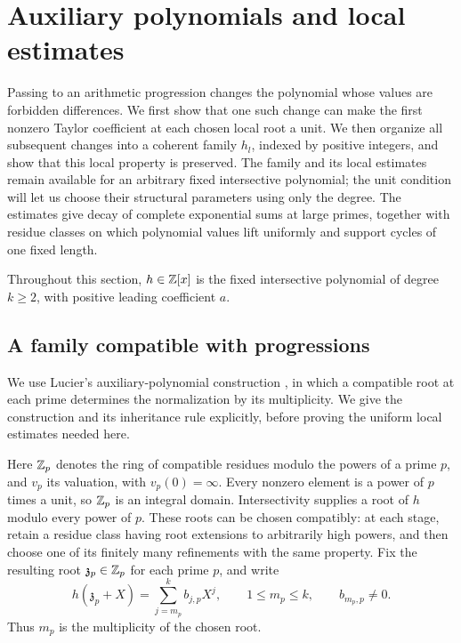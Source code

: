 \section{Auxiliary polynomials and local estimates}\label{sec:local}

Passing to an arithmetic progression changes the polynomial whose values are
forbidden differences. We first show that one such change can make the first
nonzero Taylor coefficient at each chosen local root a unit. We then organize
all subsequent changes into a coherent family \(h_l\), indexed by positive
integers, and show that this local property is preserved. The family and its
local estimates remain available for an arbitrary fixed intersective
polynomial; the unit condition will let us choose their structural parameters
using only the degree. The estimates give decay of complete exponential sums
at large primes, together with residue classes on which polynomial values
lift uniformly and support cycles of one fixed length.

Throughout this section, \(h\in\mathbb Z[x]\) is the fixed intersective polynomial of
degree \(k\ge2\), with positive leading coefficient \(a\).

\subsection{A family compatible with progressions}

We use Lucier's auxiliary-polynomial construction
\cite[Section~8]{Lucier2006}, in which a compatible root at each prime
determines the normalization by its multiplicity. We give the construction
and its inheritance rule explicitly, before proving the uniform local
estimates needed here.

Here \(\mathbb Z_p\) denotes the ring of compatible residues modulo the powers of
a prime \(p\), and \(v_p\) its valuation, with \(v_p(0)=\infty\).
Every nonzero element is a power of \(p\) times a unit, so \(\mathbb Z_p\) is an
integral domain. Intersectivity supplies a root of \(h\) modulo every power
of \(p\). These roots can be chosen compatibly: at each stage, retain a
residue class having root extensions to arbitrarily high powers, and then
choose one of its finitely many refinements with the same property. Fix the
resulting root \(\mathfrak z_p\in\mathbb Z_p\) for each prime \(p\), and write
\[
 h(\mathfrak z_p+X)=\sum_{j=m_p}^k b_{j,p}X^j,
 \qquad 1\le m_p\le k,
 \qquad b_{m_p,p}\ne0.
\]
Thus \(m_p\) is the multiplicity of the chosen root.

